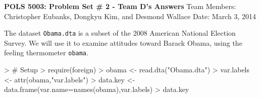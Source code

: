 \documentclass[12pt]{article}
\begin{document}


\pagestyle{empty}

\begin{center}
{\Large \textbf{POLS 5003: Problem Set \# 2 - Team D's Answers}}
\linebreak
Team Members: Christopher Eubanks, Dongkyu Kim, and Desmond Wallace
\linebreak
Date: March 3, 2014
\end{center}

The dataset \texttt{Obama.dta} is a subset of the 2008 American National Election Survey.  We will use it to examine attitudes toward Barack Obama, using the feeling thermometer \texttt{obama}.

\begin{Schunk}
\begin{Sinput}
> # Setup
> require(foreign)
> obama <- read.dta("Obama.dta")
> var.labels <- attr(obama,"var.labels")
> data.key <- data.frame(var.name=names(obama),var.labels)
> data.key
\end{Sinput}
\end{Schunk}
\end{document}
